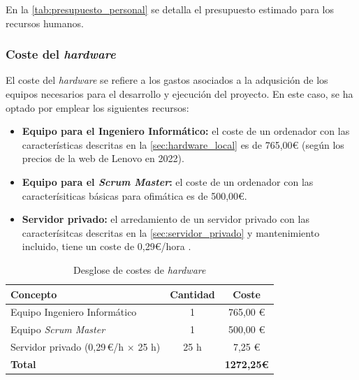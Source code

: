 \documentclass[12pt,a4paper,onecolumn,oneside]{report}
\begin{document}
En la \autoref{tab:presupuesto_personal} se detalla el presupuesto estimado para los recursos humanos.

\begin{table}[H]
\caption{Presupuesto para los recursos humanos}
\label{tab:presupuesto_personal}
\centering
{}

\end{table}

\subsubsection{Coste del \textit{hardware}}
\label{Coste del hardware}

El coste del \textit{hardware} se refiere a los gastos asociados a la adqusición de los equipos
necesarios para el desarrollo y ejecución del proyecto. En este caso, se ha optado por emplear los siguientes
recursos:

\begin{itemize}
  \item \textbf{Equipo para el Ingeniero Informático:} el coste de un ordenador con las características
  descritas en la \autoref{sec:hardware_local} es de 765,00\euro{} (según los precios de la web de 
  Lenovo en 2022).
  \item \textbf{Equipo para el \textit{Scrum Master}:} el coste de un ordenador con las caracterísiticas básicas para ofimática 
  es de 500,00\euro{}.
  \item \textbf{Servidor privado:} el arredamiento de un servidor privado con las caracterísitcas descritas
  en la \autoref{sec:servidor_privado} y mantenimiento incluido, tiene un coste de 0,29\euro{}/hora \cite{T4_pricing}. 
\end{itemize}

\begin{table}[H]
\centering
\caption{Desglose de costes de \textit{hardware}}
\label{tab:coste_hardware}
\renewcommand{\arraystretch}{1.2}
\begin{tabular}{lcc}
\hline
\textbf{Concepto} & \textbf{Cantidad} & \textbf{Coste} \\
\hline
Equipo Ingeniero Informático & 1 & 765,00 \euro{} \\
Equipo \textit{Scrum Master}          & 1 & 500,00 \euro{} \\
Servidor privado (0,29\,\euro{}/h $\times$ 25 h) & 25 h & 7,25 \euro{} \\
\hline
\textbf{Total} & & \textbf{1272,25\euro{}} \\
\hline
\end{tabular}
\end{table}
\end{document}
